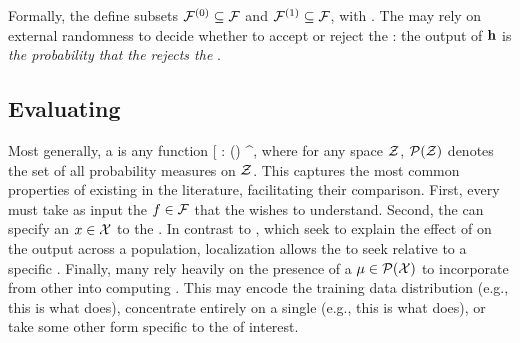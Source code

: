 Formally, the \bothhypnames{} define subsets $\mathcal{F}^{(0)} \subseteq \mathcal{F}$ and $\mathcal{F}^{(1)} \subseteq \mathcal{F}$, with
\*[
    &\nullhyp\setdelim \model \in \modelspace\nullind \\
    &\althyp\setdelim \model \in \modelspace\altind.
\]
Here, $\modelspace\nullind$ contains $\model\nullind$'s that locally agree with the possible $\modeldum\nullind$'s encoding \countmodbehaviourname{}, such as all \emph{increasing} \modelnames{}. Similarly, $\modelspace\altind$ contains all \modelnames{} with desired contrasting \modbehaviourname{}.
While it must be the case that these sets have no overlap ($\modelspace\nullind \cap \modelspace\altind = \emptyset$), it is often the case that they do not exhaustively contain all \modelnames{} ($\modelspace\nullind \cup \modelspace\altind \neq \modelspace$).
%
%
%
%
%
%
A \emph{\oraclehyptestname{}} is any way for the \pracname{}
to draw their conclusion for the \hyptestname{} solely on the output of a \fielddefname{} at an \obsname{}.
%
%
Formally, this is any function
\*[
    \oraclehyptest: \Reals^{\covdim\times\datadim} \to [0,1].
\]
%
The \username{} may rely on external randomness to decide whether to accept or reject the \nullname{}: the output of $\mathbf{h}$ is \emph{the probability that the \pracname{} rejects the \nullname{}}.

%



\subsection{Evaluating \hyptestNAMEs{}}

Most generally, 
a \emph{\fielddefname{}} is any function
\*[
    \expdef: \modelspace \times \probspace(\covspace) \times \covspace \to \Reals^{\covdim\times\datadim},
\]
where for any space $\mathcal{Z}$, $\mathcal{P}(\mathcal{Z})$ denotes the set of all probability measures on $\mathcal{Z}$.
%
%
This captures the most common properties of existing  in the literature, facilitating their comparison. 
%
First, every \fielddefname{} must take as input the \modelname{} $f\in\mathcal{F}$ that the \pracname{} wishes to understand.
Second, the \pracname{} can specify an \obsname{} $x\in\mathcal{X}$ to  the \covname{} \attname{}.
In contrast to  \methodnames{}, which seek to explain the effect of \covnames{} on the \modelname{} output across a population, localization allows the \pracname{} to seek 
\countmodbehaviourname{} relative to a specific \obsname{}.
%
Finally, many \methodnames{} rely heavily on the presence of a \emph{\basename{}}  $\mu\in\mathcal{P}(\mathcal{X})$ to incorporate \modbehaviourname{} from other \obsnames{} into computing \covname{} \attname{}.
%
This \basename{} may encode the training data distribution (e.g., this is what \shap{} does), concentrate entirely on a single \obsname{} (e.g., this is what \intgradshort{} does), or take some other form specific to the \taskname{} of interest. 
%
%
%
%

